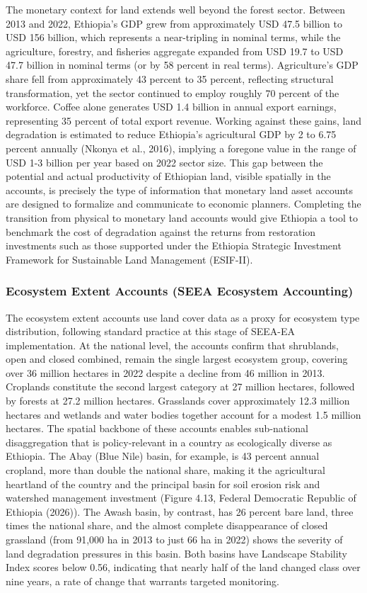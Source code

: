 \documentclass[
  letterpaper,
  DIV=11,
  numbers=noendperiod]{scrartcl}
\begin{document}
The monetary context for land extends well beyond the forest sector.
Between 2013 and 2022, Ethiopia's GDP grew from approximately USD 47.5
billion to USD 156 billion, which represents a near-tripling in nominal
terms, while the agriculture, forestry, and fisheries aggregate expanded
from USD 19.7 to USD 47.7 billion in nominal terms (or by 58 percent in
real terms). Agriculture's GDP share fell from approximately 43 percent
to 35 percent, reflecting structural transformation, yet the sector
continued to employ roughly 70 percent of the workforce. Coffee alone
generates USD 1.4 billion in annual export earnings, representing 35
percent of total export revenue. Working against these gains, land
degradation is estimated to reduce Ethiopia's agricultural GDP by 2 to
6.75 percent annually ({Nkonya et al.}, 2016), implying a foregone value
in the range of USD 1-3 billion per year based on 2022 sector size. This
gap between the potential and actual productivity of Ethiopian land,
visible spatially in the accounts, is precisely the type of information
that monetary land asset accounts are designed to formalize and
communicate to economic planners. Completing the transition from
physical to monetary land accounts would give Ethiopia a tool to
benchmark the cost of degradation against the returns from restoration
investments such as those supported under the Ethiopia Strategic
Investment Framework for Sustainable Land Management (ESIF-II).

\subsubsection{Ecosystem Extent Accounts (SEEA Ecosystem
Accounting)}\label{ecosystem-extent-accounts-seea-ecosystem-accounting-1}

The ecosystem extent accounts use land cover data as a proxy for
ecosystem type distribution, following standard practice at this stage
of SEEA-EA implementation. At the national level, the accounts confirm
that shrublands, open and closed combined, remain the single largest
ecosystem group, covering over 36 million hectares in 2022 despite a
decline from 46 million in 2013. Croplands constitute the second largest
category at 27 million hectares, followed by forests at 27.2 million
hectares. Grasslands cover approximately 12.3 million hectares and
wetlands and water bodies together account for a modest 1.5 million
hectares. The spatial backbone of these accounts enables sub-national
disaggregation that is policy-relevant in a country as ecologically
diverse as Ethiopia. The Abay (Blue Nile) basin, for example, is 43
percent annual cropland, more than double the national share, making it
the agricultural heartland of the country and the principal basin for
soil erosion risk and watershed management investment (Figure 4.13,
Federal Democratic Republic of Ethiopia (2026)). The Awash basin, by
contrast, has 26 percent bare land, three times the national share, and
the almost complete disappearance of closed grassland (from 91,000 ha in
2013 to just 66 ha in 2022) shows the severity of land degradation
pressures in this basin. Both basins have Landscape Stability Index
scores below 0.56, indicating that nearly half of the land changed class
over nine years, a rate of change that warrants targeted monitoring.
\end{document}
